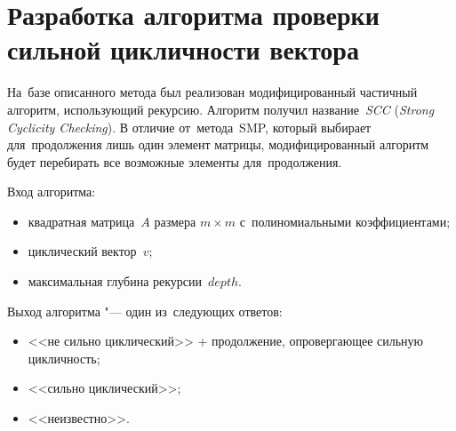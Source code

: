 \section{Разработка алгоритма проверки\\ сильной цикличности вектора}

На~базе описанного метода был реализован модифицированный частичный алгоритм, использующий рекурсию.
Алгоритм получил название~\emph{SCC}
(\emph{Strong Cyclicity Check\-ing}).
В отличие от~метода~SMP, который выбирает для~продолжения лишь один элемент матрицы,
модифицированный алгоритм будет перебирать все возможные элементы для~продолжения.
\medskip

Вход алгоритма:
\begin{itemize}
    \item
        квадратная матрица~$A$ размера $m \times m$ с~полиномиальными коэффициентами;
    \item
        циклический вектор~$v$;
    \item
        максимальная глубина рекурсии~$depth$.
\end{itemize}

Выход алгоритма "--- один из~следующих ответов:
\begin{itemize}
    \item
        <<не сильно циклический>> + продолжение, опровергающее сильную цикличность;
    \item
        <<сильно циклический>>;
    \item
        <<неизвестно>>.
\end{itemize}

